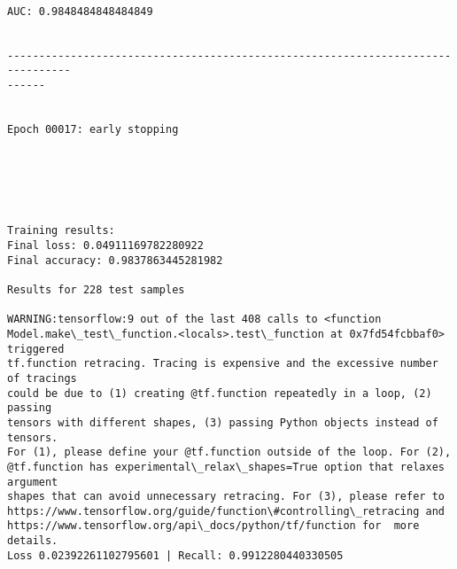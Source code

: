 \documentclass[11pt]{article}
\begin{document}
    \begin{center}
    \end{center}
    { \hspace*{\fill} \\}
    
    \begin{Verbatim}[commandchars=\\\{\}]
AUC: 0.9848484848484849


--------------------------------------------------------------------------------
------


Epoch 00017: early stopping
    \end{Verbatim}

    \begin{center}
    \end{center}
    { \hspace*{\fill} \\}
    
    \begin{center}
    \end{center}
    { \hspace*{\fill} \\}
    
    \begin{Verbatim}[commandchars=\\\{\}]

Training results:
Final loss: 0.04911169782280922
Final accuracy: 0.9837863445281982

Results for 228 test samples

WARNING:tensorflow:9 out of the last 408 calls to <function
Model.make\_test\_function.<locals>.test\_function at 0x7fd54fcbbaf0> triggered
tf.function retracing. Tracing is expensive and the excessive number of tracings
could be due to (1) creating @tf.function repeatedly in a loop, (2) passing
tensors with different shapes, (3) passing Python objects instead of tensors.
For (1), please define your @tf.function outside of the loop. For (2),
@tf.function has experimental\_relax\_shapes=True option that relaxes argument
shapes that can avoid unnecessary retracing. For (3), please refer to
https://www.tensorflow.org/guide/function\#controlling\_retracing and
https://www.tensorflow.org/api\_docs/python/tf/function for  more details.
Loss 0.02392261102795601 | Recall: 0.9912280440330505



    \end{Verbatim}
\end{document}
